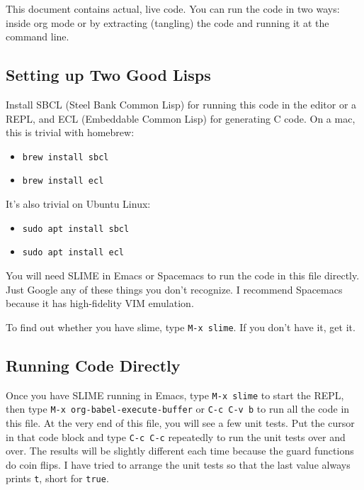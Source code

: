 \documentclass[10pt,oneside,x11names]{article}
\begin{document}
This document contains actual, live code. You can run the code in two ways:
inside org mode or by extracting (tangling) the code and running it at the
command line.

\subsection{Setting up Two Good Lisps}
\label{sec:org756d7fb}

Install SBCL (Steel Bank Common Lisp) for running this code in the editor or
a REPL, and ECL (Embeddable Common Lisp) for generating C code. On a mac,
this is trivial with homebrew:

\begin{itemize}
\item \texttt{brew install sbcl}

\item \texttt{brew install ecl}
\end{itemize}

It's also trivial on Ubuntu Linux:

\begin{itemize}
\item \texttt{sudo apt install sbcl}

\item \texttt{sudo apt install ecl}
\end{itemize}

You will need SLIME in Emacs or Spacemacs to run the code in this file
directly. Just Google any of these things you don't recognize. I recommend
Spacemacs because it has high-fidelity VIM emulation.

To find out whether you have slime, type \texttt{M-x slime}. If you don't have it,
get it.

\subsection{Running Code Directly}
\label{sec:org65ca341}

Once you have SLIME running in Emacs, type \texttt{M-x slime} to start the REPL,
then type \texttt{M-x org-babel-execute-buffer} or \texttt{C-c C-v b} to run all the code
in this file. At the very end of this file, you will see a few unit tests.
Put the cursor in that code block and type \texttt{C-c C-c} repeatedly to run the
unit tests over and over. The results will be slightly different each time
because the guard functions do coin flips. I have tried to arrange the unit
tests so that the last value always prints \texttt{t}, short for \texttt{true}.
\end{document}
